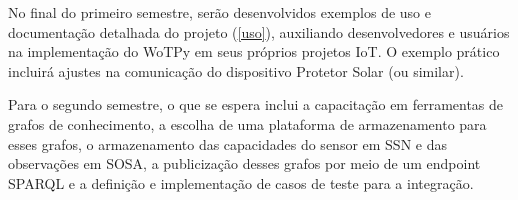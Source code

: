 No final do primeiro semestre, serão desenvolvidos exemplos de uso e documentação detalhada do projeto (\ref{uso}), auxiliando desenvolvedores e usuários na implementação do WoTPy em seus próprios projetos IoT. O exemplo prático incluirá ajustes na comunicação do dispositivo Protetor Solar (ou similar).

Para o segundo semestre, o que se espera inclui a capacitação em ferramentas de grafos de conhecimento, a escolha de uma plataforma de armazenamento para esses grafos, o armazenamento das capacidades do sensor em SSN e das observações em SOSA, a publicização desses grafos por meio de um endpoint SPARQL e a definição e implementação de casos de teste para a integração.


